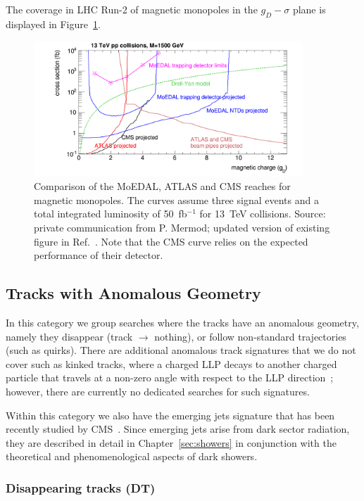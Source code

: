 The coverage in LHC Run-2 of magnetic monopoles in the $g_D-\sigma$ plane is displayed in Figure~\ref{fig:magnetic_monopole_reach}.
%
\begin{figure}[htb]
\centering
\includegraphics[width=0.9\textwidth]{plots/monopoles_xsec_13TeV_3events}
\caption{Comparison of the MoEDAL, ATLAS and CMS reaches for magnetic monopoles. The curves assume three signal events and a total integrated luminosity of 50~fb$^{-1}$ for 13~TeV collisions. Source: private communication from P. Mermod; updated version of existing figure in Ref.~\cite{DeRoeck:2011aa}. Note that the CMS curve relies on the expected performance of their detector.}
\label{fig:magnetic_monopole_reach}
\end{figure}

\subsection{Tracks with Anomalous Geometry}

In this category we group searches where the tracks have an anomalous geometry, namely they disappear (track $\to$ nothing), or follow non-standard trajectories (such as quirks). There are additional anomalous track signatures that we do not cover such as kinked tracks, where a charged LLP decays to another charged particle that travels at a non-zero angle with respect to the LLP direction~\cite{Dimopoulos:1996vz,Hamaguchi:2004df,Asai:2011wy,Jung:2015boa}; however, there are currently no dedicated searches for such signatures.

Within this category we also have the emerging jets signature that has been recently studied by CMS~\cite{Sirunyan:2018njd}. Since emerging jets arise from dark sector radiation, they are described in detail in Chapter~\ref{sec:showers} in conjunction with the theoretical and phenomenological aspects of dark showers.

\subsubsection*{Disappearing tracks (DT)}

